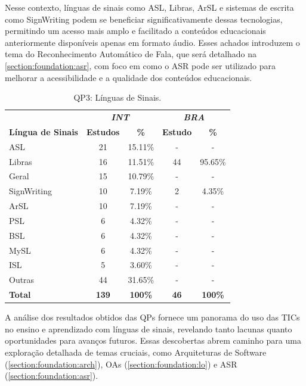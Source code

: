 \begin{itemize}
Nesse contexto, línguas de sinais como ASL, Libras, ArSL e sistemas de escrita como SignWriting podem se beneficiar significativamente dessas tecnologias, permitindo um acesso mais amplo e facilitado a conteúdos educacionais anteriormente disponíveis apenas em formato áudio. Esses achados introduzem o tema do Reconhecimento Automático de Fala, que será detalhado na \autoref{section:foundation:asr}, com foco em como o ASR pode ser utilizado para melhorar a acessibilidade e a qualidade dos conteúdos educacionais.

\begin{table}[htbp]
\caption{QP3: Línguas de Sinais.}
\label{results:table:sign-languages}
\centering
\begin{tabular}{lcccc}
\hline
 & \multicolumn{2}{c}{\textit{\textbf{INT}}} & \multicolumn{2}{c}{\textit{\textbf{BRA}}} \\ \cline{2-5} 
\textbf{Língua de Sinais} & \textbf{Estudos} & \textbf{\%} & \textbf{Estudo} & \textbf{\%} \\ \hline
ASL & 21 & 15.11\% & - & - \\
Libras & 16 & 11.51\% & 44 & 95.65\% \\
Geral & 15 & 10.79\% & - & - \\
SignWriting & 10 & 7.19\% & 2 & 4.35\% \\
ArSL & 10 & 7.19\% & - & - \\
PSL & 6 & 4.32\% & - & - \\
BSL & 6 & 4.32\% & - & - \\
MySL & 6 & 4.32\% & - & - \\
ISL & 5 & 3.60\% & - & - \\
Outras & 44 & 31.65\% & - & - \\
\textbf{Total} & \textbf{139} & \textbf{100\%} & \textbf{46} & \textbf{100\%} \\ \hline
\end{tabular}
\end{table}

\end{itemize}

A análise dos resultados obtidos das QPs fornece um panorama do uso das TICs no ensino e aprendizado com línguas de sinais, revelando tanto lacunas quanto oportunidades para avanços futuros. Essas descobertas abrem caminho para uma exploração detalhada de temas cruciais, como Arquiteturas de Software (\autoref{section:foundation:arch}), OAs (\autoref{section:foundation:lo}) e ASR (\autoref{section:foundation:asr}). 


